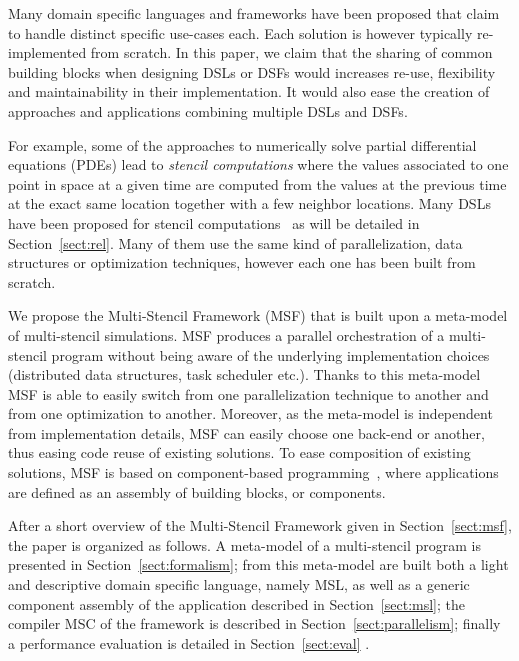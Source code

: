Many domain specific languages and frameworks have been proposed that claim to handle distinct specific use-cases each.
Each solution is however typically re-implemented from scratch.
In this paper, we claim that the sharing of common building blocks when designing DSLs or DSFs would increases re-use, flexibility and maintainability in their implementation.
It would also ease the creation of approaches and applications combining multiple DSLs and DSFs.

For example, some of the approaches to numerically solve partial differential equations (PDEs) lead to \emph{stencil computations} where the values associated to one point in space at a given time are computed from the values at the previous time at the exact same location together with a few neighbor locations.
Many DSLs have been proposed for stencil computations~\cite{spaaTangCKLL11,citeulike12258902,Ragan-Kelley:2013:HLC:2491956.2462176,DeVito:2011:LDS:2063384.2063396,Camier:2015:IPP:2820083.2820107} as will be detailed in Section~\ref{sect:rel}.
Many of them use the same kind of parallelization, data structures or optimization techniques, however each one has been built from scratch. 

We propose the Multi-Stencil Framework (MSF) that is built upon a meta-model of multi-stencil simulations. MSF produces a parallel orchestration of a multi-stencil program without being aware of the underlying implementation choices (\eg distributed data structures, task scheduler etc.). Thanks to this meta-model MSF is able to easily switch from one parallelization technique to another and from one optimization to another. Moreover, as the meta-model is independent from implementation details, MSF can easily choose one back-end or another, thus easing code reuse of existing solutions.
To ease composition of existing solutions, MSF is based on component-based programming~\cite{Szyperski:2002:CSB:515228}, where applications are defined as an assembly of building blocks, or components.

After a short overview of the Multi-Stencil Framework given in Section~\ref{sect:msf}, the paper is organized as follows. A meta-model of a multi-stencil program is presented in Section~\ref{sect:formalism}; from this meta-model are built both a light and descriptive domain specific language, namely MSL, as well as a generic component assembly of the application described in Section~\ref{sect:msl}; the compiler MSC of the framework is described in Section~\ref{sect:parallelism}; finally a performance evaluation is detailed in Section~\ref{sect:eval} .

